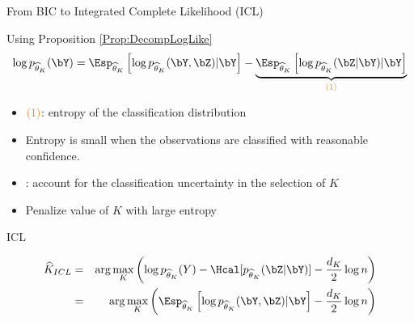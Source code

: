 \documentclass[compress,10pt]{beamer}
\begin{document}
\begin{frame}{From BIC to Integrated Complete Likelihood (ICL)}



Using Proposition \ref{Prop:DecompLogLike}
$$
\log p_{\widehat{\theta}_K}(\bY) = 
\Esp_{\widehat{\theta}_K} \left[\log p_{\widehat{\theta}_K}(\bY, \bZ) | \bY\right] - \underbrace{\Esp_{\widehat{\theta}_K} \left[\log p_{\widehat{\theta}_K}(\bZ |\bY)|\bY\right]}_{\color{dgreen}(1)}
$$

\begin{itemize}
\item $\color{dgreen}(1)$: entropy of the classification distribution
\item Entropy is small when the observations are classified with reasonable confidence.

\item \cite{biernacki2000}: account for the classification uncertainty in the selection of $K$
\item Penalize value of $K$ with large entropy
\end{itemize}
 \end{frame}

\begin{frame}{ICL}
\begin{definition}[ICL]
\begin{eqnarray*}
  \widehat{K}_{ICL} &=& \arg\max_K \left(\log p_{\widehat{\theta}_K}(Y) - \Hcal[p_{\widehat{\theta}_K}(\bZ | \bY)]- \frac{d_K}2 \log n\right)\\
  &=& \arg\max_K \left(\Esp_{\widehat{\theta}_K} \left[\log p_{\widehat{\theta}_K}(\bY, \bZ) | \bY\right] - \frac{d_K}2 \log n\right)
\end{eqnarray*}
\end{definition}

\end{frame}
\end{document}
